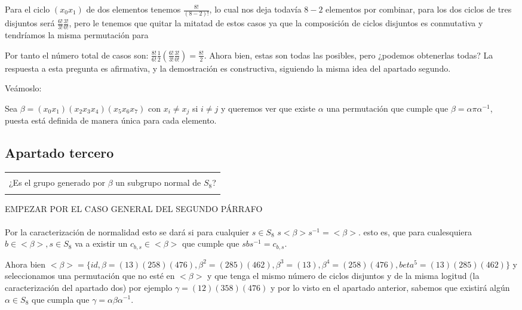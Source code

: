 \documentclass[12pt]{article}
\newenvironment{micaja}
{
    \begin{center}
    \begin{tabular}{|p{0.9\textwidth}|}
    \hline\\
    }   
    {   
    \\\\\hline
    \end{tabular} 
    \end{center}
    }
\begin{document}
Para el ciclo $(x_0 x_1)$ de dos elementos tenemos $\frac{8!}{(8-2)!}$, lo cual nos deja todavía $8-2$ elementos 
por combinar, para los dos ciclos de tres disjuntos será $\frac{6!}{3!}\frac{3!}{0!}$, pero le tenemos que quitar la mitatad de estos casos
ya que la composición de ciclos disjuntos es conmutativa y tendríamos la misma permutación para 

Por tanto el número total de casos son: $\frac{8!}{6!}\frac{1}{2}(\frac{6!}{3!}\frac{3!}{0!}) = \frac{8!}{2}.$
Ahora bien, estas son todas las posibles, pero ¿podemos obtenerlas todas?
La respuesta a esta pregunta es afirmativa, y la demostración es constructiva, siguiendo 
la misma idea del apartado segundo. 

Veámoslo: 


Sea $\beta = (x_0 x_1)( x_2 x_3 x_4)(x_5 x_6 x_7)$ con $x_i \neq x_j$ si $i \neq j$ y queremos ver que existe $\alpha$
una permutación que cumple que $\beta = \alpha \pi \alpha^{-1}$, 
puesta está definida de manera única para cada elemento.





\subsection{Apartado tercero}

\begin{micaja}
    ¿Es el grupo generado por $\beta$ un subgrupo normal de $S_8$?
\end{micaja}

EMPEZAR POR EL CASO GENERAL DEL SEGUNDO PÁRRAFO \paragraph{}

Por la caracterización de normalidad esto se dará si para cualquier $s \in S_8$
$s <\beta> s^{-1} = <\beta>.$ esto es, que para cualesquiera $b \in <\beta>, s \in S_8$ va a existir 
un $c_{b,s} \in <\beta>$  que cumple que $s bs^{-1} = c_{b,s}.$

Ahora bien $<\beta> = \{id,\beta = (1 3) (2 5 8) (4 7 6), \beta ^2 =(2 8 5)(4 6 2), \beta ^3 =(1 3), \beta ^4 = (2 5 8) (4 7 6), beta^5 = (1 3)(2 8 5)(4 6 2)\}$
y seleccionamos una permutación que no esté en $<\beta>$ y que tenga el mismo número de ciclos disjuntos y de la misma logitud (la caracterización del apartado dos) 
por ejemplo $\gamma = (1 2)(3 5 8)(4 7 6)$ 
y por lo visto en el apartado anterior, sabemos que existirá algún $\alpha \in S_8$ que cumpla que $\gamma = \alpha \beta \alpha^{-1}.$
\end{document}
